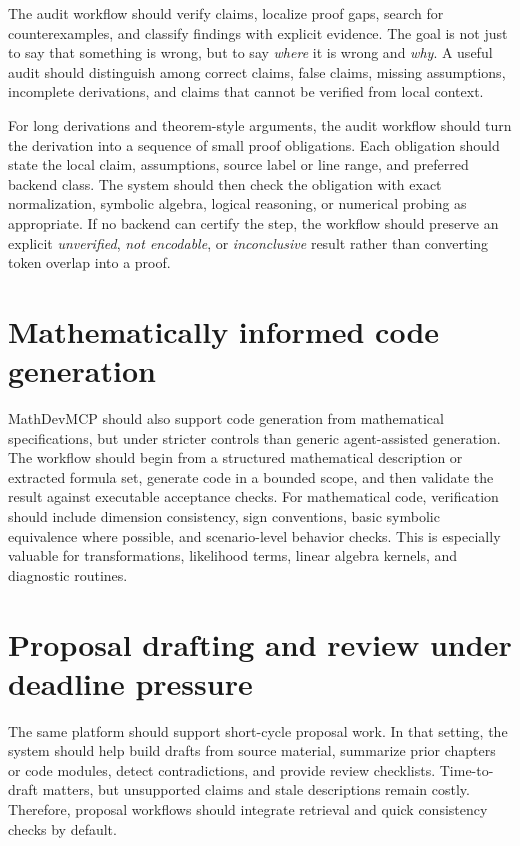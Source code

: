 The audit workflow should verify claims, localize proof gaps, search for counterexamples, and classify findings with explicit evidence. The goal is not just to say that something is wrong, but to say \emph{where} it is wrong and \emph{why}. A useful audit should distinguish among correct claims, false claims, missing assumptions, incomplete derivations, and claims that cannot be verified from local context.

For long derivations and theorem-style arguments, the audit workflow should turn the derivation into a sequence of small proof obligations. Each obligation should state the local claim, assumptions, source label or line range, and preferred backend class. The system should then check the obligation with exact normalization, symbolic algebra, logical reasoning, or numerical probing as appropriate. If no backend can certify the step, the workflow should preserve an explicit \emph{unverified}, \emph{not encodable}, or \emph{inconclusive} result rather than converting token overlap into a proof.

\section{Mathematically informed code generation}

MathDevMCP should also support code generation from mathematical specifications, but under stricter controls than generic agent-assisted generation. The workflow should begin from a structured mathematical description or extracted formula set, generate code in a bounded scope, and then validate the result against executable acceptance checks. For mathematical code, verification should include dimension consistency, sign conventions, basic symbolic equivalence where possible, and scenario-level behavior checks. This is especially valuable for transformations, likelihood terms, linear algebra kernels, and diagnostic routines.

\section{Proposal drafting and review under deadline pressure}

The same platform should support short-cycle proposal work. In that setting, the system should help build drafts from source material, summarize prior chapters or code modules, detect contradictions, and provide review checklists. Time-to-draft matters, but unsupported claims and stale descriptions remain costly. Therefore, proposal workflows should integrate retrieval and quick consistency checks by default.

